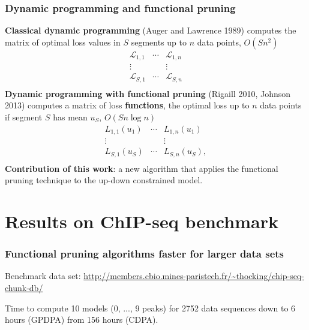 \documentclass{beamer}
\begin{document}
\begin{frame}
  \frametitle{Dynamic programming and functional pruning}
  \textbf{Classical dynamic programming} (Auger and Lawrence 1989)
  computes the matrix of optimal loss values in $S$ segments up to $n$
  data points, $O(S n^2)$
$$
\begin{array}{ccc}
  \mathcal L_{1,1} & \cdots &   \mathcal L_{1,n}\\
  \vdots &  & \vdots\\
  \mathcal L_{S,1} & \cdots & \mathcal L_{S,n}\\
\end{array}
$$
\textbf{Dynamic programming with functional pruning} (Rigaill 2010,
Johnson 2013) computes a matrix of loss \textbf{functions}, the
optimal loss up to $n$ data points if segment $S$ has mean $u_S$,
$O(S n\log n)$
$$
\begin{array}{ccc}
   L_{1,1}(u_1) & \cdots & L_{1,n}(u_1)\\
  \vdots &  & \vdots\\
   L_{S,1}(u_S) & \cdots & L_{S,n}(u_S),\\
\end{array}
$$
\textbf{Contribution of this work}: a new algorithm that applies the
functional pruning technique to the up-down constrained model.
\end{frame}

\section{Results on ChIP-seq benchmark}

\begin{frame}
  \frametitle{Functional pruning algorithms faster for larger data sets}

Benchmark data set: \url{http://members.cbio.mines-paristech.fr/~thocking/chip-seq-chunk-db/}

  

Time to compute 10 models (0, ..., 9 peaks) for 2752 data
    sequences down to \textcolor{GPDPA}{6 hours (GPDPA)} from
    \textcolor{CDPA}{156 hours (CDPA)}.
\end{frame}
\end{document}
